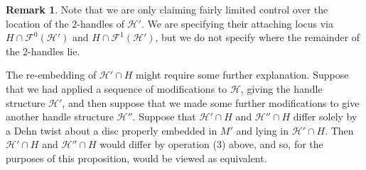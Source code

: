 \documentclass[oneside]{amsart}
\numberwithin{equation}{section}
\theoremstyle{plain}
\theoremstyle{definition}
\newtheorem{remark}[equation]{Remark}
\newcommand{\calH}{\mathcal{H}}
\begin{document}
\begin{remark}
Note that we are only claiming fairly limited control over the location of the 2-handles of $\calH'$. We are specifying their attaching locus via $H \cap \mathcal{F}^0(\mathcal{H}')$ and $H \cap \mathcal{F}^1(\mathcal{H}')$, but we do not specify where the remainder of the 2-handles lie.

The re-embedding of $\calH' \cap H$ might require some further explanation. Suppose that we had applied a sequence of modifications to $\calH$, giving the handle structure $\calH'$, and then suppose that we made some further modifications to give another handle structure $\calH''$. Suppose that $\calH' \cap H$ and $\calH'' \cap H$ differ solely by a Dehn twist about a disc properly embedded in $M'$ and lying in $\calH' \cap H$. Then $\calH' \cap H$ and $\calH'' \cap H$ would differ by operation (3) above, and so, for the purposes of this proposition, would be viewed as equivalent.
\end{remark}
\end{document}
